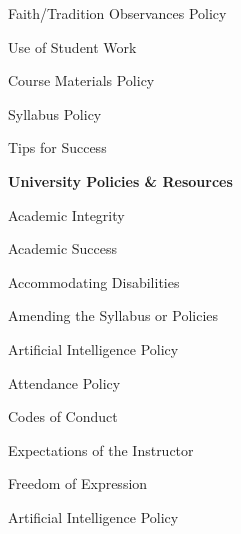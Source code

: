 \documentclass[11pt,letterpaper]{article}
\begin{document}
\begin{minipage}[t]{0.45\textwidth}
\hspace{0.3cm} Faith/Tradition Observances Policy \dotfill \pageref{faith} \par
\hspace{0.3cm} Use of Student Work \dotfill \pageref{std_work} \par
\hspace{0.3cm} Course Materials Policy \dotfill \pageref{copyright} \par
\hspace{0.3cm} Syllabus Policy \dotfill \pageref{syllabus} \par
\end{minipage} \hfill \begin{minipage}[t]{0.45\textwidth} \par %
\hspace{0.3cm} Tips for Success \dotfill \pageref{tips} \par
{\bfseries\color{scred} University Policies \& Resources} \dotfill \pageref{univ_policies} \par
\hspace{0.3cm} Academic Integrity \dotfill \pageref{univ_academicintegrity} \par
\hspace{0.3cm} Academic Success \dotfill \pageref{univ_success} \par
\hspace{0.3cm} Accommodating Disabilities \dotfill \pageref{univ_ada} \par
\hspace{0.3cm} Amending the Syllabus or Policies \dotfill \pageref{univ_amending} \par
\hspace{0.3cm} Artificial Intelligence Policy \dotfill \pageref{univ_artintel} \par
\hspace{0.3cm} Attendance Policy \dotfill \pageref{univ_attendance} \par
\hspace{0.3cm} Codes of Conduct \dotfill \pageref{univ_conduct} \par
\hspace{0.3cm} Expectations of the Instructor \dotfill \pageref{univ_instructorexp} \par
\hspace{0.3cm} Freedom of Expression \dotfill \pageref{univ_freedexpression} \par
\hspace{0.3cm} Artificial Intelligence Policy \dotfill \pageref{univ_artintel} \par

\end{minipage}
\end{document}
